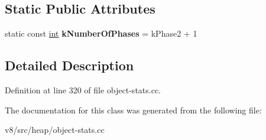 \subsection*{Static Public Attributes}
\begin{DoxyCompactItemize}
\item 
\mbox{\label{classv8_1_1internal_1_1ObjectStatsCollectorImpl_a65b0dc5c10e855868618234568ce9638}} 
static const \mbox{\hyperlink{classint}{int}} {\bfseries k\+Number\+Of\+Phases} = k\+Phase2 + 1
\end{DoxyCompactItemize}


\subsection{Detailed Description}


Definition at line 320 of file object-\/stats.\+cc.



The documentation for this class was generated from the following file\+:\begin{DoxyCompactItemize}
\item 
v8/src/heap/object-\/stats.\+cc\end{DoxyCompactItemize}
